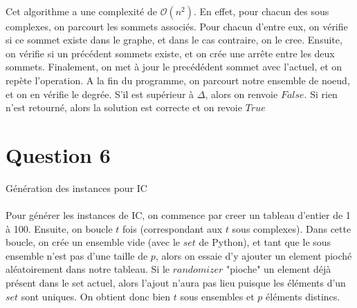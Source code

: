 \documentclass[11pt]{article}
\begin{document}
\paragraph{}
Cet algorithme a une complexité de $\mathcal{O}(n^2)$. 
En effet, pour chacun des sous complexes, on parcourt les sommets associés.
Pour chacun d'entre eux, on vérifie si ce sommet existe dans le graphe, et dans le cas contraire, on le cree.
Ensuite, on vérifie si un précédent sommets existe, et on crée une arrête entre les deux sommets.
Finalement, on met à jour le precédédent sommet avec l'actuel, et on repète l'operation.
A la fin du programme, on parcourt notre ensemble de noeud, et on en vérifie le degrée. S'il est 
supérieur à $\Delta$, alors on renvoie $False$. Si rien n'est retourné, alors la solution est correcte et on revoie $True$

\section{Question 6}

\begin{algorithm}[H]
\SetAlgoLined
{}
	\caption{Génération des instances pour IC}
\end{algorithm}
\paragraph{}
Pour générer les instances de IC, on commence par creer un tableau d'entier de 1 à 100.
Ensuite, on boucle $t$ fois (correspondant aux $t$ sous complexes). 
Dans cette boucle, on crée un ensemble vide (avec le $set$ de Python), et tant que le sous ensemble n'est 
pas d'une taille de $p$, alors on essaie d'y ajouter un element pioché aléatoirement dans notre tableau.
Si le $randomizer$ "pioche" un element déjà présent dans le set actuel, alors l'ajout n'aura pas lieu 
puisque les éléments d'un $set$ sont uniques. On obtient donc bien $t$ sous ensembles et $p$ éléments distincs.
\end{document}
